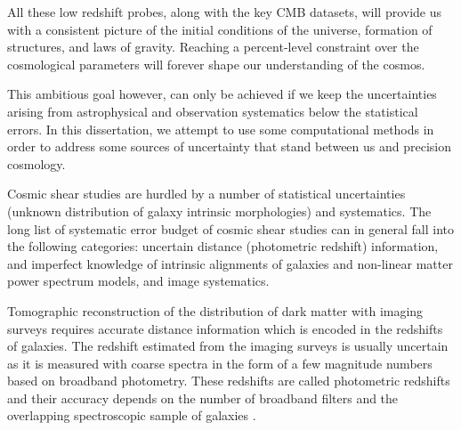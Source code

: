 All these low redshift probes, along with the key CMB datasets, will provide us 
with a consistent picture of the initial conditions of the universe, formation of structures, and laws of 
gravity. Reaching a percent-level constraint over the cosmological parameters will forever shape 
our understanding of the cosmos. 

This ambitious goal however, can only be achieved if we keep the 
uncertainties arising from astrophysical and observation systematics 
below the statistical errors. In this dissertation, we attempt to use some 
computational methods in order to address some sources of uncertainty that stand 
between us and precision cosmology. 
 



Cosmic shear studies are hurdled by a number of statistical uncertainties (unknown distribution 
of galaxy intrinsic morphologies) and systematics. The long list of systematic error budget 
of cosmic shear studies can in general fall into the following categories: uncertain distance 
(photometric redshift) information, and imperfect knowledge of intrinsic alignments of galaxies and non-linear matter 
power spectrum models, and image systematics. 

Tomographic reconstruction of the distribution of dark matter with imaging surveys requires 
accurate distance information which is encoded in the redshifts of galaxies. 
The redshift estimated from the imaging surveys is usually uncertain as it is measured with coarse 
spectra in the form of a few magnitude numbers based on broadband photometry. These redshifts are called 
photometric redshifts and their accuracy depends on the number of broadband filters and the overlapping spectroscopic 
sample of galaxies \citep{bonnett2016,choi2016,boris2016,hildebrandt2017}. %

